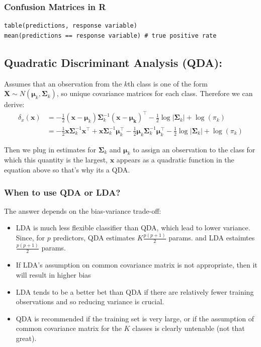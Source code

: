 \documentclass[11pt]{article}
\begin{document}
\subsubsection{Confusion Matrices in R}
\begin{verbatim}
table(predictions, response variable)
mean(predictions == response variable) # true positive rate
\end{verbatim}

\subsection{Quadratic Discriminant Analysis (QDA):}
Assumes that an observation from the $k$th class is one of the form $\boldsymbol{X} \sim N(\boldsymbol{\mu}_k, \boldsymbol{\Sigma}_k)$, so unique covariance matrices for each class. Therefore we can derive:
\begin{align*}
    \delta_{x}(\boldsymbol{x}) &= -\frac{1}{2}(\boldsymbol{x} - \boldsymbol{\mu}_k)\boldsymbol{\Sigma}_{k}^{-1}(\boldsymbol{x - \boldsymbol{\mu}_k})^\top - \frac{1}{2}\log|\boldsymbol{\Sigma}_k| + \log(\pi_k) \\
    &= -\frac{1}{2}\boldsymbol{x}\boldsymbol{\Sigma}_k^{-1}\boldsymbol{x}^\top + \boldsymbol{x}\boldsymbol{\Sigma}_{k}^{-1}\boldsymbol{\mu}_{k}^{\top} - \frac{1}{2}\boldsymbol{\mu}_k\boldsymbol{\Sigma}_k^{-1}\boldsymbol{\mu}_k^{\top} - \frac{1}{2}\log|\boldsymbol{\Sigma}_k| + \log(\pi_k)
\end{align*}

\noindent Then we plug in estimates for $\boldsymbol{\Sigma}_k$ and $\boldsymbol{\mu}_k$ to assign an observation to the class for which this quantity is the largest, $\boldsymbol{x}$ appears as a quadratic function in the equation above so that's why its a QDA.

\subsubsection{When to use QDA or LDA?}
\noindent The answer depends on the bias-variance trade-off:
\begin{itemize}
    \item LDA is much less flexible classifier than QDA, which lead to lower variance. Since, for $p$ predictors, QDA estimates $K\frac{p(p+1)}{2}$ params. and LDA estaimtes $\frac{p(p+1)}{2}$ params.
    \item If LDA's assumption on common covariance matrix is not appropriate, then it will result in higher bias
    \item LDA tends to be a better bet than QDA if there are relatively fewer training observations and so reducing variance is crucial.
    \item QDA is recommended if the training set is very large, or if the assumption of common covariance matrix for the $K$ classes is clearly untenable (not that great).
\end{itemize}
\end{document}
